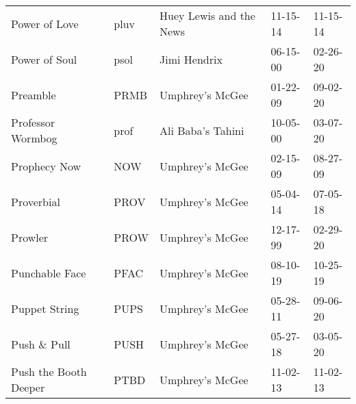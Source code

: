 \begin{longtable}{p{}p{}p{}p{}p{}}
                                                           Power of Love &          pluv &                                  Huey Lewis and the News &              11-15-14 &             11-15-14 \\
                                                           Power of Soul &          psol &                                             Jimi Hendrix &              06-15-00 &             02-26-20 \\
                                                                Preamble &          PRMB &                                          Umphrey's McGee &              01-22-09 &             09-02-20 \\
                                                       Professor Wormbog &          prof &                                        Ali Baba's Tahini &              10-05-00 &             03-07-20 \\
                                                            Prophecy Now &           NOW &                                          Umphrey's McGee &              02-15-09 &             08-27-09 \\
                                                              Proverbial &          PROV &                                          Umphrey's McGee &              05-04-14 &             07-05-18 \\
                                                                 Prowler &          PROW &                                          Umphrey's McGee &              12-17-99 &             02-29-20 \\
                                                          Punchable Face &          PFAC &                                          Umphrey's McGee &              08-10-19 &             10-25-19 \\
                                                           Puppet String &          PUPS &                                          Umphrey's McGee &              05-28-11 &             09-06-20 \\
                                                            Push \& Pull &          PUSH &                                          Umphrey's McGee &              05-27-18 &             03-05-20 \\
                                                   Push the Booth Deeper &          PTBD &                                          Umphrey's McGee &              11-02-13 &             11-02-13 \\

\end{longtable}
